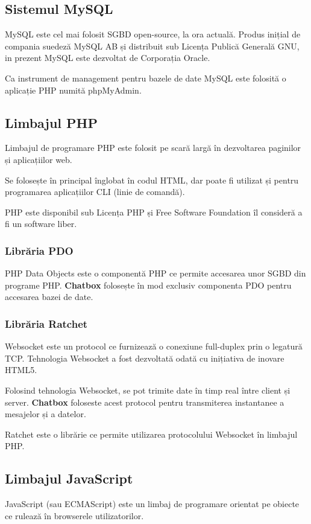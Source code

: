 \documentclass[12pt,a4paper]{article}
\begin{document}
\subsection{Sistemul MySQL}
MySQL\cite{mysql} este cel mai folosit SGBD\citep{sgbd} open-source, 
la ora actuală. Produs inițial de compania suedeză MySQL AB 
și distribuit sub Licența Publică Generală GNU\cite{free}, 
in prezent MySQL este dezvoltat
de Corporația Oracle.

Ca instrument de management pentru bazele de date MySQL
este folosită o aplicație PHP numită phpMyAdmin.

\subsection{Limbajul PHP}
Limbajul de programare PHP\citep{php} este folosit pe scară largă 
în dezvoltarea paginilor și aplicațiilor web.

Se folosește în principal înglobat în codul HTML, dar poate fi 
utilizat și pentru programarea aplicațiilor CLI (linie de comandă).

PHP este disponibil sub Licenṭa PHP ṣi Free Software Foundation 
îl consideră a fi un software liber\citep{free}.

\subsubsection{Librăria PDO}
PHP Data Objects\citep{pdo} este o componentă PHP ce permite accesarea unor SGBD din
programe PHP. \textbf{Chatbox} folosește  în mod exclusiv componenta PDO pentru 
accesarea bazei de date. 

\subsubsection{Librăria Ratchet}
Websocket\citep{websocket} este un protocol ce furnizează o conexiune full-duplex prin o legatură TCP. Tehnologia Websocket a fost dezvoltată odată cu inițiativa de 
inovare HTML5. 

Folosind tehnologia Websocket, se pot trimite date în timp real între 
client și server. \textbf{Chatbox} foloseste acest protocol pentru
transmiterea instantanee a mesajelor și a datelor.

Ratchet\citep{ratchet} este o librărie ce permite utilizarea protocolului 
Websocket în limbajul PHP.

\subsection{Limbajul JavaScript}
JavaScript (sau ECMAScript) este un limbaj de programare orientat pe obiecte\citep{javascript} ce rulează  în browserele utilizatorilor. 
\end{document}
